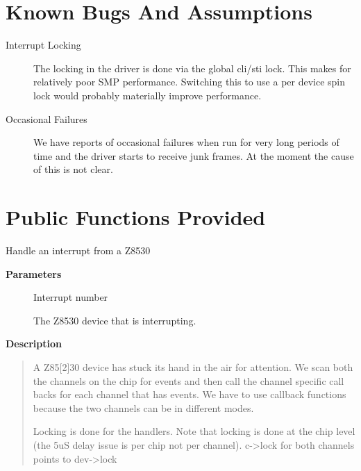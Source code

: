 \documentclass[a4paper,8pt,english]{sphinxmanual}
\begin{document}
\section{Known Bugs And Assumptions}
\label{networking/z8530book:known-bugs-and-assumptions}\begin{description}
\item[{Interrupt Locking}] \leavevmode
The locking in the driver is done via the global cli/sti lock. This
makes for relatively poor SMP performance. Switching this to use a
per device spin lock would probably materially improve performance.

\item[{Occasional Failures}] \leavevmode
We have reports of occasional failures when run for very long
periods of time and the driver starts to receive junk frames. At the
moment the cause of this is not clear.

\end{description}


\section{Public Functions Provided}
\label{networking/z8530book:public-functions-provided}

\begin{fulllineitems}
\label{networking/z8530book:c.z8530_interrupt}
Handle an interrupt from a Z8530

\end{fulllineitems}


\textbf{Parameters}
\begin{description}
\item[{}] \leavevmode
Interrupt number

\item[{}] \leavevmode
The Z8530 device that is interrupting.

\end{description}

\textbf{Description}
\begin{quote}

A Z85{[}2{]}30 device has stuck its hand in the air for attention.
We scan both the channels on the chip for events and then call
the channel specific call backs for each channel that has events.
We have to use callback functions because the two channels can be
in different modes.

Locking is done for the handlers. Note that locking is done
at the chip level (the 5uS delay issue is per chip not per
channel). c-\textgreater{}lock for both channels points to dev-\textgreater{}lock
\end{quote}
\end{document}
